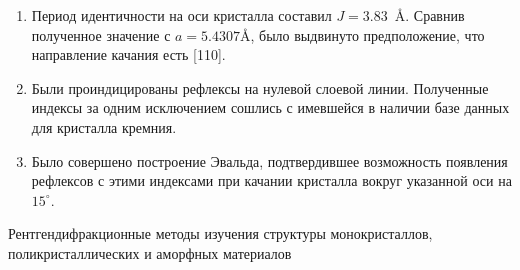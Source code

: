 \documentclass[a4paper, 12pt]{article}
\begin{document}
\begin{enumerate}
	\item Период идентичности на оси кристалла составил $J = 3.83$~\AA. Сравнив полученное значение с $a = 5.4307$\AA, было выдвинуто предположение, что направление качания есть [110].
	
	\item Были проиндицированы рефлексы на нулевой слоевой линии. Полученные индексы за одним исключением сошлись с имевшейся в наличии базе данных для кристалла кремния.
	
	\item Было совершено построение Эвальда, подтвердившее возможность появления рефлексов с этими индексами при качании кристалла вокруг указанной оси на $15^\circ$.
\end{enumerate}


\newpage

\begin{thebibliography}{1}
	Рентгендифракционные методы изучения структуры монокристаллов, поликристаллических и аморфных материалов
\end{thebibliography}
\end{document}
